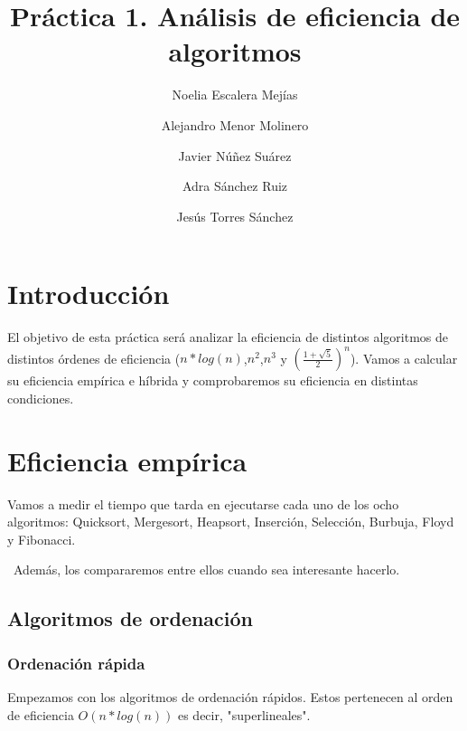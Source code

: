 \documentclass{article}
\title{Práctica 1. Análisis de eficiencia de algoritmos}
\author{Noelia Escalera Mejías \\
		\and Alejandro Menor Molinero \\
		\and Javier Núñez Suárez \\
		\and Adra Sánchez Ruiz \\
		\and Jesús Torres Sánchez}
\begin{document}
	\maketitle
	\tableofcontents
	\section{Introducción}
	El objetivo de esta práctica será analizar la eficiencia de distintos algoritmos de distintos órdenes de eficiencia ($n*log(n)$,$n^2$,$n^3$ y $(\frac{1+\sqrt{5}}{2})^n$). Vamos a calcular su eficiencia empírica e híbrida y comprobaremos su eficiencia en distintas condiciones.
	\section{Eficiencia empírica}
	Vamos a medir el tiempo que tarda en ejecutarse cada uno de los ocho algoritmos: Quicksort, Mergesort, Heapsort, Inserción, Selección, Burbuja, Floyd y Fibonacci.
	
	\
	Además, los compararemos entre ellos cuando sea interesante hacerlo.
	\subsection{Algoritmos de ordenación}
	\subsubsection{Ordenación rápida}
	Empezamos con los algoritmos de ordenación rápidos. Estos pertenecen al orden de eficiencia $O(n*log(n))$ es decir, "superlineales".
	
\end{document}
